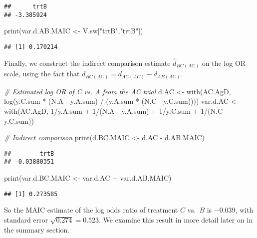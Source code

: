 \documentclass[
]{article}
\newenvironment{Shaded}{\begin{snugshade}}{\end{snugshade}}
\newcommand{\CommentTok}[1]{\textcolor[rgb]{0.56,0.35,0.01}{\textit{#1}}}
\newcommand{\DecValTok}[1]{\textcolor[rgb]{0.00,0.00,0.81}{#1}}
\newcommand{\FunctionTok}[1]{\textcolor[rgb]{0.00,0.00,0.00}{#1}}
\newcommand{\NormalTok}[1]{#1}
\newcommand{\OtherTok}[1]{\textcolor[rgb]{0.56,0.35,0.01}{#1}}
\newcommand{\SpecialCharTok}[1]{\textcolor[rgb]{0.00,0.00,0.00}{#1}}
\newcommand{\StringTok}[1]{\textcolor[rgb]{0.31,0.60,0.02}{#1}}
\begin{document}
\begin{verbatim}
##      trtB 
## -3.385924
\end{verbatim}

\begin{Shaded}
\begin{Highlighting}[]
\FunctionTok{print}\NormalTok{(var.d.AB.MAIC }\OtherTok{\textless{}{-}}\NormalTok{ V.sw[}\StringTok{"trtB"}\NormalTok{,}\StringTok{"trtB"}\NormalTok{])}
\end{Highlighting}
\end{Shaded}

\begin{verbatim}
## [1] 0.170214
\end{verbatim}

Finally, we construct the indirect comparison estimate
\(\hat{d}_{BC(AC)}\) on the log OR scale, using the fact that
\(d_{BC(AC)}=d_{AC(AC)}-d_{AB(AC)}\).

\begin{Shaded}
\begin{Highlighting}[]
\CommentTok{\# Estimated log OR of C vs. A from the AC trial}
\NormalTok{d.AC }\OtherTok{\textless{}{-}} \FunctionTok{with}\NormalTok{(AC.AgD, }\FunctionTok{log}\NormalTok{(y.C.sum }\SpecialCharTok{*}\NormalTok{ (N.A }\SpecialCharTok{{-}}\NormalTok{ y.A.sum) }\SpecialCharTok{/}\NormalTok{ (y.A.sum }\SpecialCharTok{*}\NormalTok{ (N.C }\SpecialCharTok{{-}}\NormalTok{ y.C.sum))))}
\NormalTok{var.d.AC }\OtherTok{\textless{}{-}} \FunctionTok{with}\NormalTok{(AC.AgD, }\DecValTok{1}\SpecialCharTok{/}\NormalTok{y.A.sum }\SpecialCharTok{+} \DecValTok{1}\SpecialCharTok{/}\NormalTok{(N.A }\SpecialCharTok{{-}}\NormalTok{ y.A.sum) }\SpecialCharTok{+} \DecValTok{1}\SpecialCharTok{/}\NormalTok{y.C.sum }\SpecialCharTok{+} \DecValTok{1}\SpecialCharTok{/}\NormalTok{(N.C }\SpecialCharTok{{-}}\NormalTok{ y.C.sum))}

\CommentTok{\# Indirect comparison}
\FunctionTok{print}\NormalTok{(d.BC.MAIC }\OtherTok{\textless{}{-}}\NormalTok{ d.AC }\SpecialCharTok{{-}}\NormalTok{ d.AB.MAIC)}
\end{Highlighting}
\end{Shaded}

\begin{verbatim}
##        trtB 
## -0.03880351
\end{verbatim}

\begin{Shaded}
\begin{Highlighting}[]
\FunctionTok{print}\NormalTok{(var.d.BC.MAIC }\OtherTok{\textless{}{-}}\NormalTok{ var.d.AC }\SpecialCharTok{+}\NormalTok{ var.d.AB.MAIC)}
\end{Highlighting}
\end{Shaded}

\begin{verbatim}
## [1] 0.273585
\end{verbatim}

So the MAIC estimate of the log odds ratio of treatment \(C\) vs.~\(B\)
is −0.039, with standard error \(\sqrt{0.274}=0.523\). We examine this
result in more detail later on in the summary section.
\end{document}
